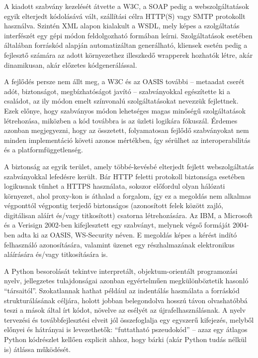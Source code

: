 \bigskip

A kiadott szabvány kezelését átvette a W3C, a SOAP pedig a webszolgáltatások egyik elterjedt kódolásává vált, szállítási célra HTTP(S) vagy SMTP protokollt használva. Szintén XML alapon kialakult a WSDL, mely képes a szolgáltatás interfészét egy gépi módon feldolgozható formában leírni. Szolgáltatások esetében általában forráskód alapján automatizáltan generálható, kliensek esetén pedig a fejlesztő számára az adott környezethez illeszkedő wrapperek hozhatók létre, akár dinamikusan, akár előzetes kódgenerálással.

A fejlődés persze nem állt meg, a W3C és az OASIS további -- metaadat cserét adót, biztonságot, megbízhatóságot javító -- szabványokkal egészítette ki a családot, az ily módon emelt színvonalú szolgáltatásokat nevezzük fejlettnek. Ezek előnye, hogy szabványos módon lehetséges magas minőségű szolgáltatások létrehozása, miközben a kód továbbra is az üzleti logikára fókuszál. Érdemes azonban megjegyezni, hogy az összetett, folyamatosan fejlődő szabványokat nem minden implementáció követi azonos mértékben, így sérülhet az interoperabilitás és a platformfüggetlenség.

A biztonság az egyik terület, amely többé-kevésbé elterjedt fejlett webszolgáltatás szabványokkal lefedésre került. Bár HTTP feletti protokoll biztonsága esetében logikusnak tűnhet a HTTPS használata, sokszor előfordul olyan hálózati környezet, ahol proxy-kon is áthalad a forgalom, így ez a megoldás nem alkalmas végponttól végpontig terjedő biztonságos (azonosított felek között zajló, digitálisan aláírt és/vagy titkosított) csatorna létrehozására. Az IBM, a Microsoft és a Verisign 2002-ben kifejlesztett egy szabványt, melynek végső formáját 2004-ben adta ki az OASIS, WS\hyp{}Security néven. E megoldás képes a kérést indító felhasználó azonosítására, valamint üzenet egy részhalmazának elektronikus aláírására és/vagy titkosítására is.

\bigskip

A Python besorolását tekintve interpretált, objektum-orientált programozási nyelv, jellegzetes tulajdonságai azonban egyértelműen megkülönböztetik hasonló ``társaitól''. Szokatlannak hathat például az indentálás használata a forráskód strukturálásának céljára, holott jobban belegondolva hosszú távon olvashatóbbá teszi a mások által írt kódot, növelve az esélyét az újrafelhasználásnak. A nyelv tervezési és továbbfejlesztési elveit jól összefoglalja egy egyszerű kifejezés, melyből előnyei és hátrányai is levezethetők: ``futtatható pszeudokód'' -- azaz egy átlagos Python kódrészlet kellően explicit ahhoz, hogy bárki (akár Python tudás nélkül is) átlássa működését.

